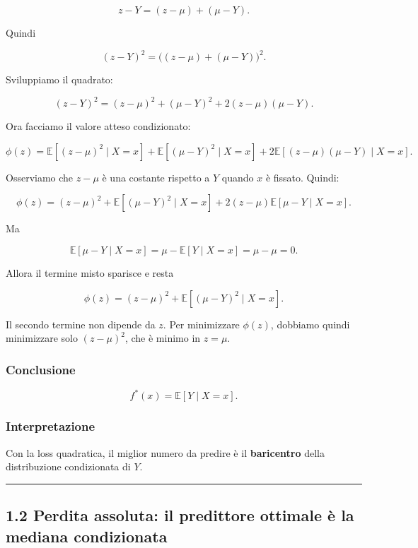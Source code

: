 \documentclass[
]{article}
\begin{document}
\[
z-Y = (z-\mu) + (\mu-Y).
\]

Quindi

\[
(z-Y)^2 = \big((z-\mu)+(\mu-Y)\big)^2.
\]

Sviluppiamo il quadrato:

\[
(z-Y)^2 = (z-\mu)^2 + (\mu-Y)^2 + 2(z-\mu)(\mu-Y).
\]

Ora facciamo il valore atteso condizionato:

\[
\phi(z)=\mathbb{E}[(z-\mu)^2\mid X=x]
+ \mathbb{E}[(\mu-Y)^2\mid X=x]
+ 2\mathbb{E}[(z-\mu)(\mu-Y)\mid X=x].
\]

Osserviamo che \(z-\mu\) è una costante rispetto a \(Y\) quando \(x\) è
fissato. Quindi:

\[
\phi(z)=(z-\mu)^2 + \mathbb{E}[(\mu-Y)^2\mid X=x]
+2(z-\mu)\mathbb{E}[\mu-Y\mid X=x].
\]

Ma

\[
\mathbb{E}[\mu-Y\mid X=x]
= \mu - \mathbb{E}[Y\mid X=x]
= \mu-\mu=0.
\]

Allora il termine misto sparisce e resta

\[
\phi(z)=(z-\mu)^2 + \mathbb{E}[(\mu-Y)^2\mid X=x].
\]

Il secondo termine non dipende da \(z\). Per minimizzare \(\phi(z)\),
dobbiamo quindi minimizzare solo \((z-\mu)^2\), che è minimo in
\(z=\mu\).

\subsubsection{Conclusione}\label{conclusione}

\[
f^*(x)=\mathbb{E}[Y\mid X=x].
\]

\subsubsection{Interpretazione}\label{interpretazione}

Con la loss quadratica, il miglior numero da predire è il
\textbf{baricentro} della distribuzione condizionata di \(Y\).

\begin{center}\rule{0.5\linewidth}{0.5pt}\end{center}

\subsection{1.2 Perdita assoluta: il predittore ottimale è la mediana
condizionata}\label{perdita-assoluta-il-predittore-ottimale-uxe8-la-mediana-condizionata}
\end{document}
